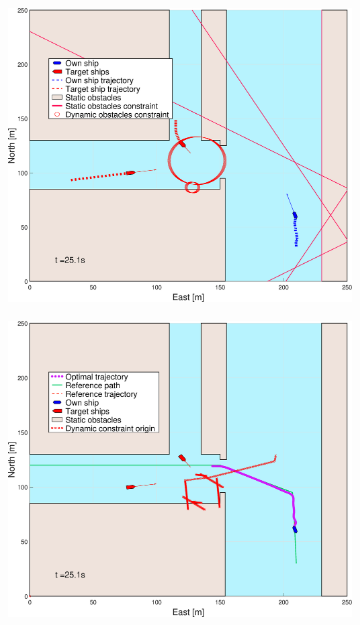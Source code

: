 \begin{figure}[!ht]
\begin{subfigure}[b]{0.494\textwidth}
        \subcaption{}
    \end{subfigure}
    \hfill
    \\
    \begin{subfigure}[b]{0.494\textwidth}
        \centering
        \includegraphics[width=\textwidth]{Images/Figures/Havn1/_Simple_0fig1_time=25}
        \subcaption{}
    \end{subfigure}
    \hfill
    \begin{subfigure}[b]{0.494\textwidth}
        \centering
        \includegraphics[width=\textwidth]{Images/Figures/Havn1/_Simple_0fig999_time=25}

\end{subfigure}
\end{figure}
